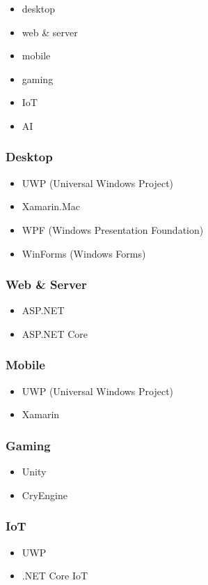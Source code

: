 \documentclass{article}
\begin{document}
\begin{itemize}
    \item desktop
    \item web \& server
    \item mobile
    \item gaming
    \item IoT
    \item AI
\end{itemize}

\subsubsection{Desktop}

\begin{itemize}
    \item UWP (Universal Windows Project)
    \item Xamarin.Mac
    \item WPF (Windows Presentation Foundation)
    \item WinForms (Windows Forms)
\end{itemize}

\subsubsection{Web \& Server}
\begin{itemize}
    \item ASP.NET
    \item ASP.NET Core
\end{itemize}

\subsubsection{Mobile}
\begin{itemize}
    \item UWP (Universal Windows Project)
    \item Xamarin
\end{itemize}

\subsubsection{Gaming}
\begin{itemize}
    \item Unity
    \item CryEngine
\end{itemize}

\subsubsection{IoT}
\begin{itemize}
    \item UWP
    \item .NET Core IoT
\end{itemize}
\end{document}
